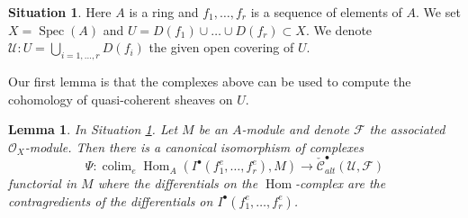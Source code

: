 \documentclass{stacks-project}
\theoremstyle{plain}
\newtheorem{lemma}[subsection]{Lemma}
\theoremstyle{definition}
\newtheorem{situation}[subsection]{Situation}
\theoremstyle{remark}
\numberwithin{equation}{subsection}
\def\colim{\mathop{\mathrm{colim}}\nolimits}
\def\Spec{\mathop{\mathrm{Spec}}}
\def\Hom{\mathop{\mathrm{Hom}}\nolimits}
\begin{document}
\begin{situation}
\label{situation-complex}
Here $A$ is a ring and $f_1, \ldots, f_r$ is a sequence of elements of $A$.
We set $X = \Spec(A)$ and $U = D(f_1) \cup \ldots \cup D(f_r) \subset X$.
We denote $\mathcal{U} : U = \bigcup_{i = 1, \ldots, r} D(f_i)$ the
given open covering of $U$.
\end{situation}

\noindent
Our first lemma is that the complexes above can be used to compute
the cohomology of quasi-coherent sheaves on $U$.

\begin{lemma}
\label{lemma-alternating-cech-complex}
In Situation \ref{situation-complex}. Let $M$ be an $A$-module and
denote $\mathcal{F}$ the associated $\mathcal{O}_X$-module. Then
there is a canonical isomorphism of complexes
$$
\Psi : \colim_e \Hom_A(I^\bullet(f_1^e, \ldots, f_r^e), M)
\longrightarrow
\check{\mathcal{C}}_{alt}^\bullet(\mathcal{U}, \mathcal{F})
$$
functorial in $M$ where the differentials on the $\Hom$-complex
are the contragredients of the differentials on
$I^\bullet(f_1^e, \ldots, f_r^e)$.
\end{lemma}
\end{document}

